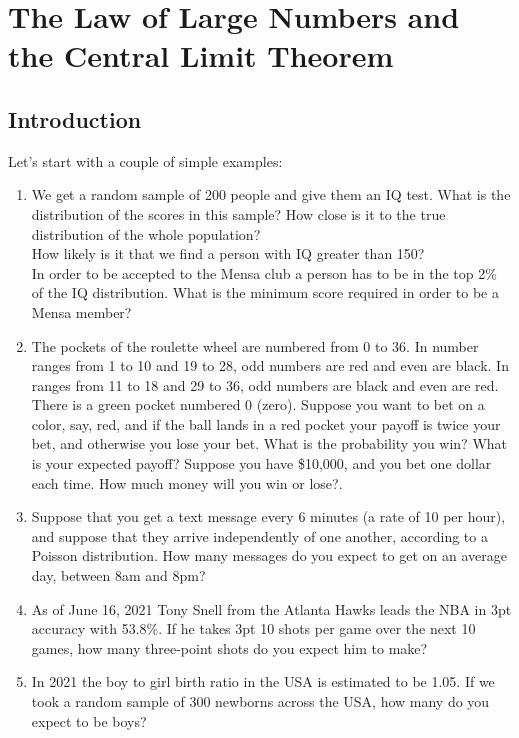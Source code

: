\hypertarget{ch:llnclt}{%
\chapter{The Law of Large Numbers and the Central Limit Theorem}\label{ch:llnclt}}

\section{Introduction}
Let's start with a couple of simple examples:
\begin{enumerate}
\item We get a random sample of 200 people and give them an IQ test. What is the distribution of the scores in this sample? How close is it to the true distribution of the whole population?\\
How likely is it that we find a person with IQ greater than 150?\\
In order to be accepted to the Mensa club a person has to be in the top 2\% of the IQ distribution. What is the minimum score required in order to be a Mensa member?
\item The pockets of the roulette wheel are numbered from 0 to 36. In number ranges from 1 to 10 and 19 to 28, odd numbers are red and even are black. In ranges from 11 to 18 and 29 to 36, odd numbers are black and even are red. There is a green pocket numbered 0 (zero). Suppose you want to bet on a color, say, red, and if the ball lands in a red pocket your payoff is twice your bet, and otherwise you lose your bet. What is the probability you win? What is your expected payoff? Suppose you have \$10,000, and you bet one dollar each time. How much money will you win or lose?.
\item Suppose that you get a text message every 6 minutes (a rate of 10 per hour), and suppose that they arrive independently of one another, according to a Poisson distribution. How many messages do you expect to get on an average day, between 8am and 8pm? 
\item {}As of June 16, 2021 Tony Snell from the Atlanta Hawks leads the NBA in 3pt accuracy with 53.8\%.
If he takes 3pt 10 shots per game over the next 10 games, how many three-point shots do you expect him to make?
\item {}In 2021 the boy to girl birth ratio in the USA is estimated to be 1.05. If we took a random sample of 300 newborns across the USA, how many do you expect to be boys?
\end{enumerate}

